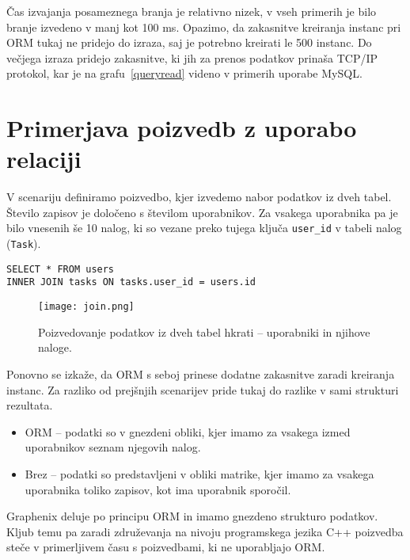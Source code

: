 \documentclass[a4paper,12pt,openright]{book}
\begin{document}
    \noindent
    Čas izvajanja posameznega branja je relativno nizek, v vseh primerih je bilo branje izvedeno v manj kot 100 ms. Opazimo, da zakasnitve kreiranja instanc pri ORM tukaj ne pridejo do izraza, saj je potrebno kreirati le 500 instanc. Do večjega izraza pridejo zakasnitve, ki jih za prenos podatkov prinaša TCP/IP protokol, kar je na grafu~\ref{queryread} videno v primerih uporabe MySQL.

    \section{Primerjava poizvedb z uporabo relaciji}
    \label{join_lbl}

    V scenariju definiramo poizvedbo, kjer izvedemo nabor podatkov iz dveh tabel. Število zapisov je določeno s številom uporabnikov. Za vsakega uporabnika pa je bilo vnesenih še 10 nalog, ki so vezane preko tujega ključa {\tt user\_id} v tabeli nalog ({\tt Task}).
    
\begin{verbatim}
SELECT * FROM users 
INNER JOIN tasks ON tasks.user_id = users.id
\end{verbatim}

    \begin{figure}[H]
        \centerline{\texttt{[image: join.png]}}
        \caption{Poizvedovanje podatkov iz dveh tabel hkrati – uporabniki in njihove naloge.}
        \label{join}
    \end{figure}

    \noindent
    Ponovno se izkaže, da ORM s seboj prinese dodatne zakasnitve zaradi kreiranja instanc. Za razliko od prejšnjih scenarijev pride tukaj do razlike v sami strukturi rezultata.
    
    \begin{itemize}
        \item ORM – podatki so v gnezdeni obliki, kjer imamo za vsakega izmed uporabnikov seznam njegovih nalog.
        \item Brez – podatki so predstavljeni v obliki matrike, kjer imamo za vsakega uporabnika toliko zapisov, kot ima uporabnik sporočil.
    \end{itemize}

    \noindent
    Graphenix deluje po principu ORM in imamo gnezdeno strukturo podatkov. Kljub temu pa zaradi združevanja na nivoju programskega jezika C++ poizvedba steče v primerljivem času s poizvedbami, ki ne uporabljajo ORM.
    
\end{document}
